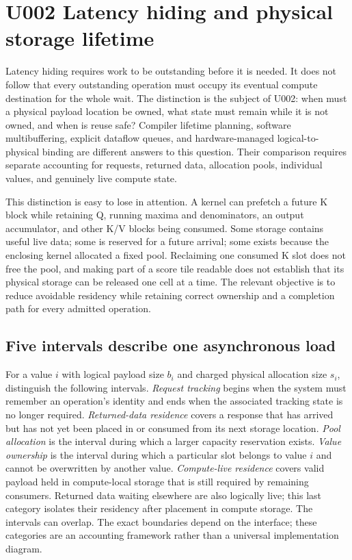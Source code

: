 \section{U002 Latency hiding and physical storage lifetime}
\label{sec:u002}

Latency hiding requires work to be outstanding before it is needed. It does not follow that every outstanding operation must occupy its eventual compute destination for the whole wait. The distinction is the subject of U002: when must a physical payload location be owned, what state must remain while it is not owned, and when is reuse safe? Compiler lifetime planning, software multibuffering, explicit dataflow queues, and hardware-managed logical-to-physical binding are different answers to this question. Their comparison requires separate accounting for requests, returned data, allocation pools, individual values, and genuinely live compute state.

This distinction is easy to lose in attention. A kernel can prefetch a future K block while retaining Q, running maxima and denominators, an output accumulator, and other K/V blocks being consumed. Some storage contains useful live data; some is reserved for a future arrival; some exists because the enclosing kernel allocated a fixed pool. Reclaiming one consumed K slot does not free the pool, and making part of a score tile readable does not establish that its physical storage can be released one cell at a time. The relevant objective is to reduce avoidable residency while retaining correct ownership and a completion path for every admitted operation.

\subsection{Five intervals describe one asynchronous load}

For a value $i$ with logical payload size $b_i$ and charged physical allocation size $s_i$, distinguish the following intervals. \emph{Request tracking} begins when the system must remember an operation's identity and ends when the associated tracking state is no longer required. \emph{Returned-data residence} covers a response that has arrived but has not yet been placed in or consumed from its next storage location. \emph{Pool allocation} is the interval during which a larger capacity reservation exists. \emph{Value ownership} is the interval during which a particular slot belongs to value $i$ and cannot be overwritten by another value. \emph{Compute-live residence} covers valid payload held in compute-local storage that is still required by remaining consumers. Returned data waiting elsewhere are also logically live; this last category isolates their residency after placement in compute storage. The intervals can overlap. The exact boundaries depend on the interface; these categories are an accounting framework rather than a universal implementation diagram.


